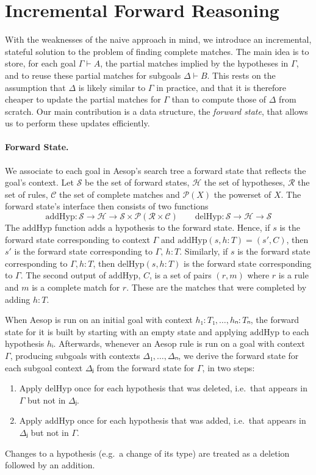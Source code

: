 \documentclass[runningheads]{llncs}
\newcommand{\Rules}{\ensuremath{\mathcal{R}}}
\newcommand{\Hyps}{\ensuremath{\mathcal{H}}}
\newcommand{\States}{\ensuremath{\mathcal{S}}}
\newcommand{\CMatches}{\ensuremath{\mathcal{C}}}
\newcommand{\addHyp}{\ensuremath{\mathrm{addHyp}}}
\newcommand{\delHyp}{\ensuremath{\mathrm{delHyp}}}
\newcommand{\powerset}{\ensuremath{\mathcal{P}}}
\begin{document}
\section{Incremental Forward Reasoning}%
\label{sec:incremental}

With the weaknesses of the naive approach in mind, we introduce an incremental, stateful solution to the problem of finding complete matches.
The main idea is to store, for each goal $Γ ⊢ A$, the partial matches implied by the hypotheses in $Γ$, and to reuse these partial matches for subgoals $Δ ⊢ B$.
This rests on the assumption that $Δ$ is likely similar to $Γ$ in practice, and that it is therefore cheaper to update the partial matches for $Γ$ than to compute those of $Δ$ from scratch.
Our main contribution is a data structure, the \emph{forward state}, that allows us to perform these updates efficiently.

\paragraph{Forward State.}
We associate to each goal in Aesop's search tree a forward state that reflects the goal's context.
Let $\States$ be the set of forward states, $\Hyps$ the set of hypotheses, $\Rules$ the set of rules, $\CMatches$ the set of complete matches and $\powerset(X)$ the powerset of $X$.
The forward state's interface then consists of two functions
\begin{equation*}
  \addHyp : \States → \Hyps → \States × \powerset(\Rules × \CMatches) \qquad \delHyp : \States → \Hyps → \States
\end{equation*}
The $\addHyp$ function adds a hypothesis to the forward state.
Hence, if $s$ is the forward state corresponding to context $Γ$ and $\addHyp(s, h : T) = (s', C)$, then $s'$ is the forward state corresponding to $Γ,\, h : T$.
Similarly, if $s$ is the forward state corresponding to $Γ, h : T$, then $\delHyp(s, h : T)$ is the forward state corresponding to $Γ$.
The second output of $\addHyp$, $C$, is a set of pairs $(r, m)$ where $r$ is a rule and $m$ is a complete match for $r$.
These are the matches that were completed by adding $h : T$.

When Aesop is run on an initial goal with context $h₁ : T₁, \dots, hₙ : Tₙ$, the forward state for it is built by starting with an empty state and applying $\addHyp$ to each hypothesis $hᵢ$.
Afterwards, whenever an Aesop rule is run on a goal with context $Γ$, producing subgoals with contexts $Δ₁, \dots, Δₙ$, we derive the forward state for each subgoal context $Δⱼ$ from the forward state for $Γ$, in two steps:
\begin{enumerate}
  \item Apply $\delHyp$ once for each hypothesis that was deleted, i.e.\ that appears in $Γ$ but not in $Δⱼ$.
  \item Apply $\addHyp$ once for each hypothesis that was added, i.e.\ that appears in $Δⱼ$ but not in $Γ$.
\end{enumerate}
Changes to a hypothesis (e.g.\ a change of its type) are treated as a deletion followed by an addition.
\end{document}
